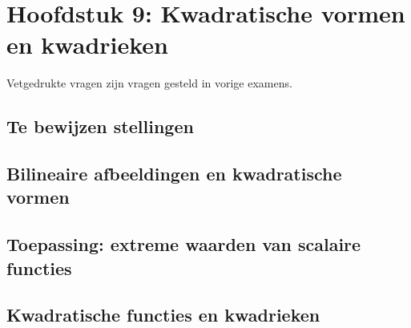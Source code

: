 \documentclass[12pt]{article}
\begin{document}
\date{}    
\maketitle
    \section*{Hoofdstuk 9: Kwadratische vormen en kwadrieken}
    Vetgedrukte vragen zijn vragen gesteld in vorige examens.
    \setcounter{section}{9}
    \subsection*{Te bewijzen stellingen}
    \subsection{Bilineaire afbeeldingen en kwadratische vormen}
    \subsection{Toepassing: extreme waarden van scalaire functies}
    \subsection{Kwadratische functies en kwadrieken}
\end{document}
